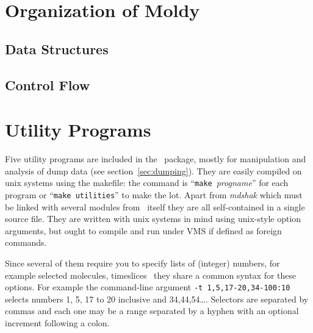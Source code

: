 \chapter{Organization of Moldy} %
\section{Data Structures}%
\label{sec:structs}
\section{Control Flow}%

\chapter{Utility Programs} %
Five utility programs are included in the \moldy\ package, mostly for
manipulation and analysis of dump data (see section~\ref{sec:dumping}).
They are easily compiled on unix systems using the makefile: the
command is ``\verb'make'~{\em progname\/}'' for each program or
``\verb'make utilities''' to make the lot.  Apart from {\em mdshak\/}
which must be linked with several modules from \moldy\ itself they are
all self-contained in a single source file.  They are written with
unix systems in mind using unix-style option arguments, but ought to
compile and run under VMS if defined as foreign commands.

Since several of them require you to specify lists of (integer)
numbers, for example selected molecules, timeslices \etc\ they share a
common syntax for these options.  For example the command-line
argument \mbox{\verb'-t 1,5,17-20,34-100:10'} selects numbers 1, 5, 17 to 20
inclusive and 34,44,54\ldots.  Selectors are separated by commas and
each one may be a range separated by a hyphen with an optional
increment following a colon.

